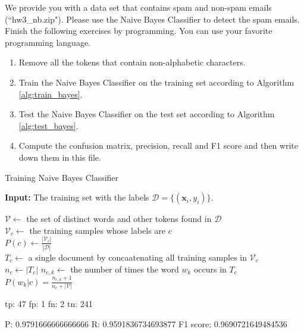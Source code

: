 \documentclass[11pt,letter,notitlepage]{article}
\begin{document}
\newpage
\begin{exercise}
We provide you with a data set that contains spam and non-spam emails (``hw3\_nb.zip"). Please use the Naive Bayes Classifier to detect the spam emails.
Finish the following exercises by programming. You can use your favorite programming language.
\begin{enumerate}
\item Remove all the tokens that contain non-alphabetic characters.
\item Train the Naive Bayes Classifier on the training set according to Algorithm \ref{alg:train_bayes}.
\item Test the Naive Bayes Classifier on the test set according to Algorithm \ref{alg:test_bayes}.
\item Compute the confusion matrix, precision, recall and F1 score and then write down them in this file.
\end{enumerate}

\end{exercise}

\begin{algorithm}
\caption{Training Naive Bayes Classifier}
\label{alg:train_bayes}
\textbf{Input:} The training set with the labels $\mathcal{D}=\{(\textbf{x}_i,y_i)\}.$
\begin{algorithmic}[1]
\STATE $\mathcal{V}\leftarrow$ the set of distinct words and other tokens found in $\mathcal{D}$\\
\STATE $\mathcal{V}_c\leftarrow$ the training samples whose labels are $c$\\
\STATE $P(c)\leftarrow\frac{|\mathcal{V}_c|}{|\mathcal{D}|}$\\
\STATE $T_c\leftarrow$ a single document by concaatenating all training samples in $\mathcal{V}_c$\\
\STATE $n_c\leftarrow |T_c|$
\STATE $n_{c,k}\leftarrow$ the number of times the word $w_k$ occurs in $T_c$\\
\STATE $P(w_k|c)=\frac{n_{c,k}+1}{n_c+|\mathcal{V}|}$
\ENDFOR
\ENDFOR
\end{algorithmic}
\end{algorithm}

\begin{solution}
	\heiti
	tp: 47
	fp: 1
	fn: 2
	tn: 241
	
	P: 0.9791666666666666
	R: 0.9591836734693877
	F1 score: 0.9690721649484536
\end{solution}
\end{document}

